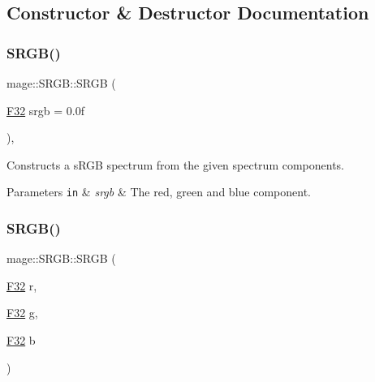 \subsection{Constructor \& Destructor Documentation}
\hypertarget{structmage_1_1_s_r_g_b_a905acfb761908ff8ad8d59d684063638}{}\label{structmage_1_1_s_r_g_b_a905acfb761908ff8ad8d59d684063638} 
\subsubsection{\texorpdfstring{S\+R\+G\+B()}{SRGB()}\hspace{0.1cm}{\footnotesize\ttfamily [1/7]}}
{\footnotesize\ttfamily mage\+::\+S\+R\+G\+B\+::\+S\+R\+GB (\begin{DoxyParamCaption}\item[{\hyperlink{namespacemage_aa97e833b45f06d60a0a9c4fc22ae02c0}{F32}}]{srgb = {\ttfamily 0.0f} }\end{DoxyParamCaption})\hspace{0.3cm}{\ttfamily [explicit]}, {\ttfamily [noexcept]}}

Constructs a s\+R\+GB spectrum from the given spectrum components.


\begin{DoxyParams}[1]{Parameters}
\mbox{\tt in}  & {\em srgb} & The red, green and blue component. \\
\hline
\end{DoxyParams}
\hypertarget{structmage_1_1_s_r_g_b_ad4bacb51b6f9da7e5347ea1ed6661cd9}{}\label{structmage_1_1_s_r_g_b_ad4bacb51b6f9da7e5347ea1ed6661cd9} 
\subsubsection{\texorpdfstring{S\+R\+G\+B()}{SRGB()}\hspace{0.1cm}{\footnotesize\ttfamily [2/7]}}
{\footnotesize\ttfamily mage\+::\+S\+R\+G\+B\+::\+S\+R\+GB (\begin{DoxyParamCaption}\item[{\hyperlink{namespacemage_aa97e833b45f06d60a0a9c4fc22ae02c0}{F32}}]{r,  }\item[{\hyperlink{namespacemage_aa97e833b45f06d60a0a9c4fc22ae02c0}{F32}}]{g,  }\item[{\hyperlink{namespacemage_aa97e833b45f06d60a0a9c4fc22ae02c0}{F32}}]{b }\end{DoxyParamCaption})\hspace{0.3cm}{\ttfamily [noexcept]}}

